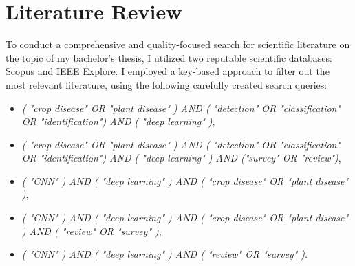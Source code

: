 \documentclass{BachelorBUI}
\begin{document}
\section{Literature Review}
To conduct a comprehensive and quality-focused search for scientific literature on the topic of my bachelor's thesis, I utilized two reputable scientific databases: Scopus and IEEE Explore. 
I employed a key-based approach to filter out the most relevant literature, using the following carefully created search queries: 
\begin{itemize}
    \item \textit{( "crop disease" OR "plant disease" ) AND ( "detection" OR "classification" OR "identification") AND ( "deep learning" )}, 
    \item \textit{( "crop disease" OR "plant disease" ) AND ( "detection" OR "classification" OR "identification") AND ( "deep learning" )  AND ("survey" OR "review")}, 
    \item \textit{( "CNN" ) AND ( "deep learning" ) AND ( "crop disease" OR "plant disease" )},
    \item \textit{( "CNN" ) AND ( "deep learning" ) AND ( "crop disease" OR "plant disease" ) AND ( "review" OR "survey" )},
    \item \textit{( "CNN" ) AND ( "deep learning" ) AND ( "review" OR "survey" )}.
\end{itemize}
\end{document}
